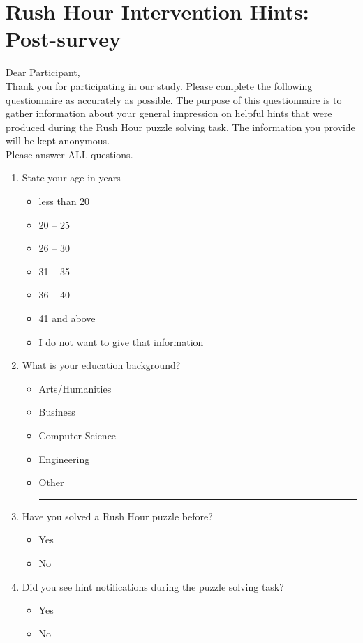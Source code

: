 \chapter{Rush Hour Intervention Hints: Post-survey}
\label{apx:rushpost}
Dear Participant,\\
Thank you for participating in our study. Please complete the following questionnaire as accurately as possible. The purpose of this questionnaire is to gather information about your general impression on helpful hints that were produced during the Rush Hour puzzle solving task. The information you provide will be kept anonymous. \\
Please answer ALL questions.

\begin{enumerate}[topsep=-4em]
\item State your age in years
\begin{itemize}[topsep=-6em, label={o}]
\itemsep-1em 
\item less than 20
\item 20 -- 25
\item 26 -- 30
\item 31 -- 35
\item 36 -- 40
\item 41 and above
\item I do not want to give that information
\end{itemize}
\item What is your education background?
\begin{itemize}[topsep=-6em, label={o}]
\itemsep-1em 
\item Arts/Humanities
\item Business
\item Computer Science
\item Engineering
\item Other \rule{4cm}{0.4pt}
\end{itemize}
\item Have you solved a Rush Hour puzzle before?
\begin{itemize}[topsep=-6em, label={o}]
\itemsep-1em 
\item Yes
\item No
\end{itemize}
\item Did you see hint notifications during the puzzle solving task?
\begin{itemize}[topsep=-6em, label={o}]
\itemsep-1em 
\item Yes
\item No

\end{itemize}
\end{enumerate}
